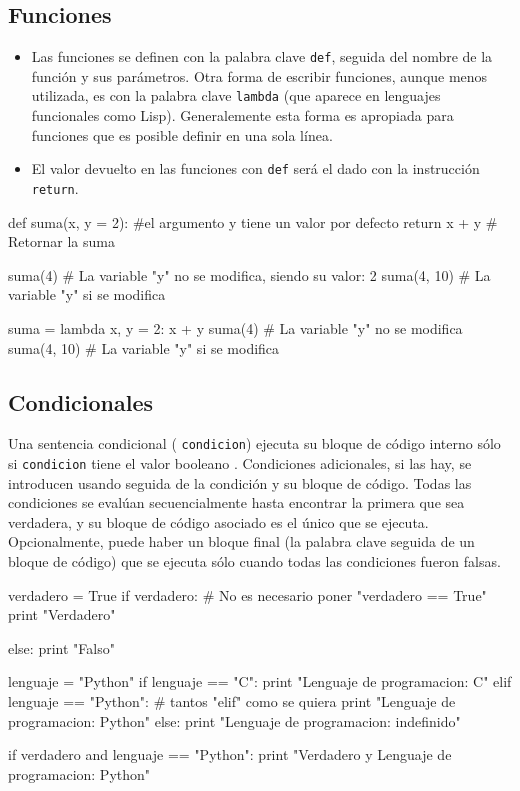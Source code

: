 \subsection{Funciones}
\begin{itemize}

  \item  Las funciones se definen con la palabra clave \verb~def~, seguida del nombre de
  la función y sus parámetros. 
  Otra forma de escribir funciones, aunque menos utilizada, es con la palabra clave \verb~lambda~ (que aparece en lenguajes funcionales como Lisp). Generalemente esta forma es apropiada para funciones que es posible definir en una sola línea.
  
  
  \item  El valor devuelto en las funciones con \verb~def~ será el dado con la instrucción \verb~return~.
  \end{itemize}


\begin{pyconsole}
def suma(x, y = 2): #el argumento y tiene un valor por defecto
    return x + y # Retornar la suma

suma(4) # La variable "y" no se modifica, siendo su valor: 2
suma(4, 10) # La variable "y" si se modifica
\end{pyconsole}


\begin{pyconsole}
suma = lambda x, y = 2: x + y
suma(4) # La variable "y" no se modifica
suma(4, 10) # La variable "y" si se modifica
\end{pyconsole}

\subsection{Condicionales}
 Una sentencia condicional ( \verb~condicion~) ejecuta su bloque de código interno 
 sólo si \verb~condicion~ tiene el valor booleano .  Condiciones adicionales, si las hay, se introducen usando  seguida de la condición y su bloque de código. Todas las condiciones se evalúan secuencialmente hasta encontrar la primera que sea verdadera, y su bloque de código asociado es el único que se ejecuta. Opcionalmente, puede haber un bloque final (la palabra clave  seguida de un bloque de código) que se ejecuta sólo cuando todas las condiciones fueron falsas.



\begin{pyconsole}
verdadero = True
if verdadero: # No es necesario poner "verdadero == True"
    print "Verdadero"

else:
    print "Falso"

lenguaje = "Python"
if lenguaje == "C": 
    print "Lenguaje de programacion: C"
elif lenguaje == "Python": # tantos "elif" como se quiera
    print "Lenguaje de programacion: Python"
else: 
    print "Lenguaje de programacion: indefinido"

if verdadero and lenguaje == "Python": 
    print "Verdadero y Lenguaje de programacion: Python"

\end{pyconsole}






